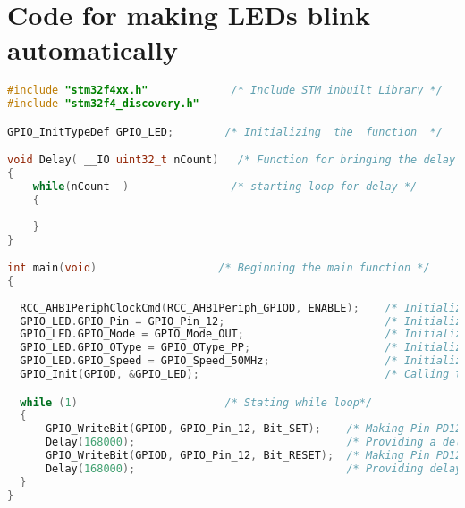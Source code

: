 \section{Code for making LEDs blink automatically}
\begin{lstlisting}[language=C++]
#include "stm32f4xx.h"             /* Include STM inbuilt Library */
#include "stm32f4_discovery.h"

GPIO_InitTypeDef GPIO_LED;        /* Initializing  the  function  */

void Delay( __IO uint32_t nCount)   /* Function for bringing the delay */
{
	while(nCount--)                /* starting loop for delay */
	{
		
	}
}

int main(void)                   /* Beginning the main function */
{
  
  RCC_AHB1PeriphClockCmd(RCC_AHB1Periph_GPIOD, ENABLE);    /* Initializing the clock for PortD and enabling it */
  GPIO_LED.GPIO_Pin = GPIO_Pin_12;                         /* Initializing the Pin 12 pf port D*/
  GPIO_LED.GPIO_Mode = GPIO_Mode_OUT;                      /* Initializing the Pin PD12 to work in output Mode */
  GPIO_LED.GPIO_OType = GPIO_OType_PP;                     /* Initializing the Pin PD12 to work Push PUll Mode */
  GPIO_LED.GPIO_Speed = GPIO_Speed_50MHz;                  /* Initializing the speed */
  GPIO_Init(GPIOD, &GPIO_LED);                             /* Calling the function Init By passing two values */

  while (1)                       /* Stating while loop*/
  {
	  GPIO_WriteBit(GPIOD, GPIO_Pin_12, Bit_SET);    /* Making Pin PD12 output as high*/
	  Delay(168000);                                 /* Providing a delay */
	  GPIO_WriteBit(GPIOD, GPIO_Pin_12, Bit_RESET);  /* Making Pin PD12 output as low */
      Delay(168000);                                 /* Providing delay */
  }
}

\end{lstlisting}


